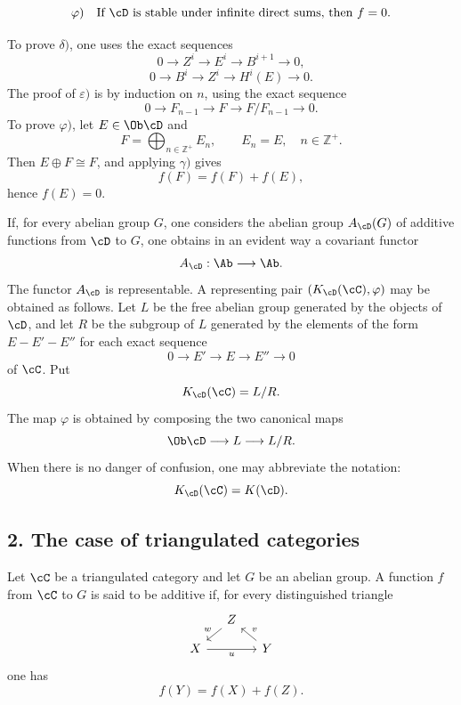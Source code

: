 \[
\varphi)\quad
\text{If }\cD\text{ is stable under infinite direct sums, then }f=0.
\]

To prove $\delta)$, one uses the exact sequences
\[
0\longrightarrow Z^i\longrightarrow E^i\longrightarrow B^{i+1}\longrightarrow 0,
\]
\[
0\longrightarrow B^i\longrightarrow Z^i\longrightarrow H^i(E)\longrightarrow 0.
\]
The proof of $\varepsilon)$ is by induction on $n$, using the exact sequence
\[
0\longrightarrow F_{n-1}\longrightarrow F\longrightarrow F/F_{n-1}\longrightarrow 0.
\]
To prove $\varphi)$, let $E\in\Ob\cD$ and
\[
F=\bigoplus_{n\in\mathbb Z^+}E_n,\qquad E_n=E,\quad n\in\mathbb Z^+.
\]
Then $E\oplus F\cong F$, and applying $\gamma)$ gives
\[
f(F)=f(F)+f(E),
\]
hence $f(E)=0$.

If, for every abelian group $G$, one considers the abelian group $A_{\cD}(G)$ of additive functions from $\cD$ to $G$, one obtains in an evident way a covariant functor
\[
A_{\cD}:\Ab\longrightarrow\Ab.
\]
The functor $A_{\cD}$ is representable. A representing pair $(K_{\cD}(\cC),\varphi)$ may be obtained as follows. Let $L$ be the free abelian group generated by the objects of $\cD$, and let $R$ be the subgroup of $L$ generated by the elements of the form $E-E'-E''$ for each exact sequence
\[
0\longrightarrow E'\longrightarrow E\longrightarrow E''\longrightarrow 0
\]
of $\cC$. Put
\[
K_{\cD}(\cC)=L/R.
\]
The map $\varphi$ is obtained by composing the two canonical maps
\[
\Ob\cD\longrightarrow L\longrightarrow L/R.
\]
When there is no danger of confusion, one may abbreviate the notation:
\[
K_{\cD}(\cC)=K(\cD).
\]

\subsection*{2. The case of triangulated categories}

Let $\cC$ be a triangulated category and let $G$ be an abelian group. A function $f$ from $\cC$ to $G$ is said to be additive if, for every distinguished triangle
\[
\begin{tikzcd}[column sep=small,row sep=small]
& Z \arrow[dl,"w"']\\
X \arrow[rr,"u"'] && Y \arrow[ul,"v"']
\end{tikzcd}
\]
one has
\[
f(Y)=f(X)+f(Z).
\]

